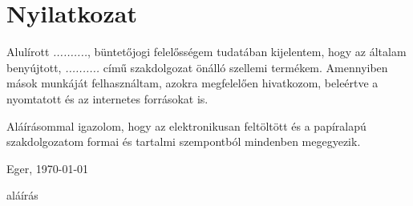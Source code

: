 \documentclass{thesis-ekf}
\begin{document}
\chapter*{Nyilatkozat}
\thispagestyle{empty}

Alulírott \emph{..........}, büntetőjogi felelősségem tudatában kijelentem, hogy az általam benyújtott, \emph{..........} című szakdolgozat önálló szellemi termékem. Amennyiben mások munkáját felhasználtam, azokra megfelelően hivatkozom, beleértve a nyomtatott és az internetes forrásokat is.

Aláírásommal igazolom, hogy az elektronikusan feltöltött és a papíralapú szakdolgozatom formai és tartalmi szempontból mindenben megegyezik.

\bigskip
\begin{flushleft}
Eger, \today
\end{flushleft}

\bigskip
\begin{flushright}
aláírás\hspace{3cm}\mbox{}
\end{flushright}

\end{document}
